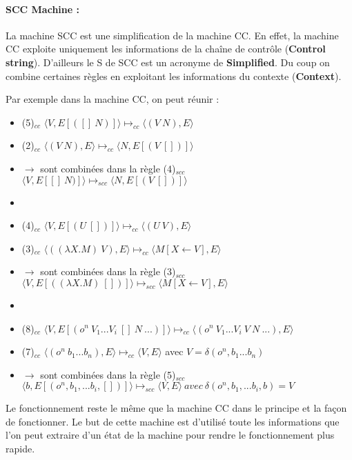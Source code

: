 \documentclass[10pt,a4paper]{article}
\begin{document}
			
			
			\paragraph{SCC Machine :}
		
				La machine SCC est une simplification de la machine CC. En effet, la machine CC exploite uniquement les informations de la chaîne de contrôle (\textbf{Control string}). D'ailleurs le S de SCC est un acronyme de \textbf{Simplified}. Du coup on combine certaines règles en exploitant les informations du contexte (\textbf{Context}).
				\bigbreak
				
				
				Par exemple dans la machine CC, on peut réunir :
				
				\begin{itemize}
					\item[] (5)$_{cc}$ $\langle V,E[([]~N)]\rangle \longmapsto_{cc} \langle(V~N),E\rangle$
					\item[] (2)$_{cc}$ $\langle(V~N),E\rangle \longmapsto_{cc}  \langle N,E[(V~[])]\rangle$
					\item[] $\rightarrow$ sont combinées dans la règle (4)$_{scc}$ $ \langle V,E[[]~N)]\rangle \longmapsto_{scc} \langle N,E[(V~[])]\rangle$
					\item[]
					\item[] (4)$_{cc}$ $\langle V,E[(U~[])]\rangle \longmapsto_{cc} \langle(U~V),E\rangle$
					\item[]	(3)$_{cc}$ $\langle((\lambda X.M)~V),E\rangle \longmapsto_{cc} \langle M[X\longleftarrow V],E\rangle$
					\item[] $\rightarrow$ sont combinées dans la règle (3)$_{scc}$ $\langle V,E[((\lambda X.M)~[])]\rangle \longmapsto_{scc} \langle M[X\leftarrow V],E\rangle$
					\item[]
					\item[] (8)$_{cc}$ $\langle V,E[(o^{n}~V_{1}...V_{i}~[]~N~...)]\rangle \longmapsto_{cc} \langle(o^{n}~V_{1}...V_{i}~V~N ~...),E\rangle$ 
					\item[] (7)$_{cc}$ $\langle(o^{n}~b_{1}...b_{n}),E\rangle \longmapsto_{cc}  \langle V,E\rangle$ avec $V = \delta(o^{n},b_{1}...b_{n})$ 
					\item[] $\rightarrow$ sont combinées dans la règle (5)$_{scc}$ $\langle b,E[(o^{n},b_{1},...b_{i},[])]\rangle \longmapsto_{scc} \langle V,E\rangle~avec~\delta
					(o^{n},b_{1},...b_{i},b)=V$
				\end{itemize}
				\medbreak
				
				Le fonctionnement reste le même que la machine CC dans le principe et la façon de fonctionner. Le but de cette machine est d'utilisé toute les informations que l'on peut extraire d'un état de la machine pour rendre le fonctionnement plus rapide.
				\bigbreak
				
\end{document}
